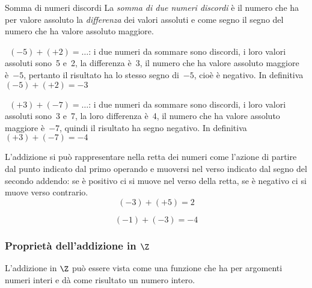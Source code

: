 \begin{definizione}{Somma di numeri discordi}{}
La \emph{somma di due numeri discordi} è il numero che ha per 
valore assoluto la \emph{differenza} dei valori assoluti
e come segno il segno del numero che ha valore assoluto maggiore.
\end{definizione}

\begin{esempio}{}{}
~\((-5)+(+2)=\ldots\): i due numeri da sommare sono discordi, i loro valori 
assoluti sono~5 e~2, la differenza è~3,
il numero che ha valore assoluto maggiore è~\(-5\), pertanto il risultato 
ha lo stesso segno di~\(-5\), cioè è negativo.
In definitiva~\((-5)+(+2)=-3\)
\end{esempio}


\begin{esempio}{}{}
~\((+3)+(-7)=\ldots\): i due numeri da sommare sono discordi, i loro valori 
assoluti sono~3 e~7, la loro differenza è~4,
il numero che ha valore assoluto maggiore è~\(-7\), quindi il risultato ha 
segno negativo.
In definitiva~\((+3)+(-7)=-4\)
\end{esempio}

L'addizione si può rappresentare nella retta dei numeri come l'azione di 
partire dal punto indicato dal primo operando e 
muoversi nel verso indicato dal segno del secondo addendo: 
se è positivo ci si muove nel verso della retta, 
se è negativo ci si muove verso contrario.
\[(-3)+(+5)=2\]
\begin{center}
\intaddlinea

\end{center}
\[ (-1)+(-3) = -4\]
\begin{center}
\intaddlineb
\end{center}

\subsubsection{Proprietà dell'addizione in \(\Z\)}

L'addizione in \(\Z\) può essere vista come una funzione che ha per 
argomenti numeri interi e dà come risultato un numero intero.

